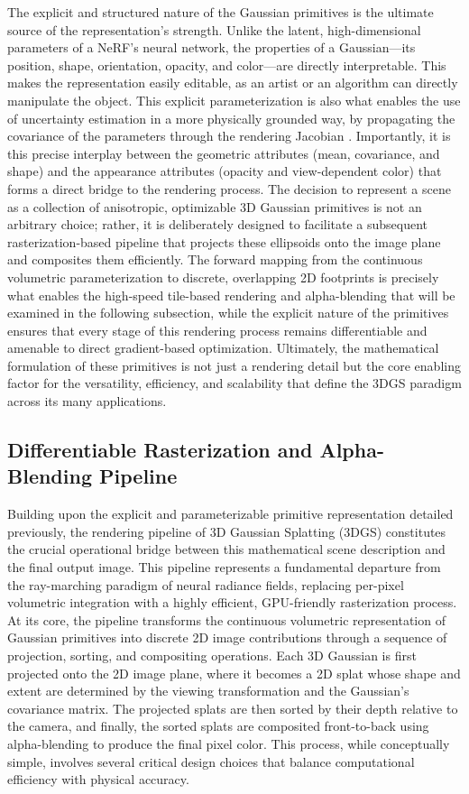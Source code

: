 \documentclass[11pt]{article}
\begin{document}
The explicit and structured nature of the Gaussian primitives is the ultimate source of the representation's strength. Unlike the latent, high-dimensional parameters of a NeRF's neural network, the properties of a Gaussian---its position, shape, orientation, opacity, and color---are directly interpretable. This makes the representation easily editable, as an artist or an algorithm can directly manipulate the object. This explicit parameterization is also what enables the use of uncertainty estimation in a more physically grounded way, by propagating the covariance of the parameters through the rendering Jacobian \cite{ref25}. Importantly, it is this precise interplay between the geometric attributes (mean, covariance, and shape) and the appearance attributes (opacity and view-dependent color) that forms a direct bridge to the rendering process. The decision to represent a scene as a collection of anisotropic, optimizable 3D Gaussian primitives is not an arbitrary choice; rather, it is deliberately designed to facilitate a subsequent rasterization-based pipeline that projects these ellipsoids onto the image plane and composites them efficiently. The forward mapping from the continuous volumetric parameterization to discrete, overlapping 2D footprints is precisely what enables the high-speed tile-based rendering and alpha-blending that will be examined in the following subsection, while the explicit nature of the primitives ensures that every stage of this rendering process remains differentiable and amenable to direct gradient-based optimization. Ultimately, the mathematical formulation of these primitives is not just a rendering detail but the core enabling factor for the versatility, efficiency, and scalability that define the 3DGS paradigm across its many applications.

\subsection{Differentiable Rasterization and Alpha-Blending Pipeline}

Building upon the explicit and parameterizable primitive representation detailed previously, the rendering pipeline of 3D Gaussian Splatting (3DGS) constitutes the crucial operational bridge between this mathematical scene description and the final output image. This pipeline represents a fundamental departure from the ray-marching paradigm of neural radiance fields, replacing per-pixel volumetric integration with a highly efficient, GPU-friendly rasterization process. At its core, the pipeline transforms the continuous volumetric representation of Gaussian primitives into discrete 2D image contributions through a sequence of projection, sorting, and compositing operations. Each 3D Gaussian is first projected onto the 2D image plane, where it becomes a 2D splat whose shape and extent are determined by the viewing transformation and the Gaussian's covariance matrix. The projected splats are then sorted by their depth relative to the camera, and finally, the sorted splats are composited front-to-back using alpha-blending to produce the final pixel color. This process, while conceptually simple, involves several critical design choices that balance computational efficiency with physical accuracy.
\end{document}
